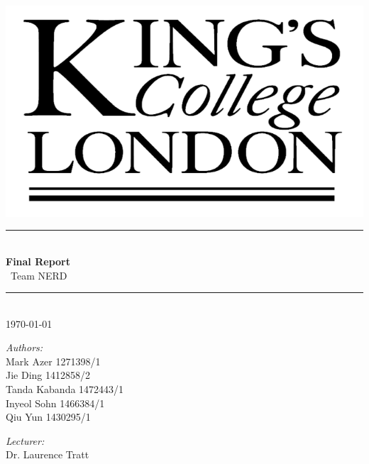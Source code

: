 \documentclass[11pt]{article}
\begin{document}
	\begin{titlepage} %
	\center
	\newcommand{\HRule}{\rule{\linewidth}{0.5mm}} 
\includegraphics[scale=0.2]{kingslogo}\\
\HRule \\[0.4cm]
{ \huge \bfseries Final Report}\\[0.4cm] %
	\ Team NERD
\HRule \\[1.5cm]
{\large \today}\\[10cm] 
	

\begin{minipage}{0.4\textwidth}
	\begin{flushleft} \large
		\emph{Authors:}\\
			Mark Azer 1271398/1\\
			Jie Ding 1412858/2 \\
			Tanda Kabanda 1472443/1 \\
			Inyeol Sohn 1466384/1 \\
			Qiu Yun 1430295/1 \\
	\end{flushleft}
\end{minipage}
\begin{minipage}{0.4\textwidth}
	\begin{flushright} \large
		\emph{Lecturer:} \\
		Dr. Laurence Tratt
	\end{flushright}
\end{minipage}\\[4cm]
	
	\end{titlepage}
	\tableofcontents
	\newpage
\end{document}
